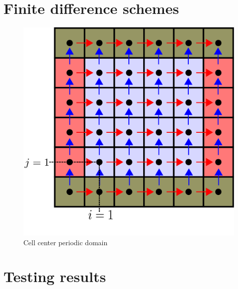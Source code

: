 \documentclass[12pt]{article}
\begin{document}
\section{Finite difference schemes}
    
    
    \newpage
    
    \begin{figure}[H]
        \includegraphics[height=0.5\textheight]{../../../media/periodic-BCs}
        \caption{Cell center periodic domain}
        \label{fig:periodic-domain}
    \end{figure}                                                            

\section{Testing results}


\end{document}

